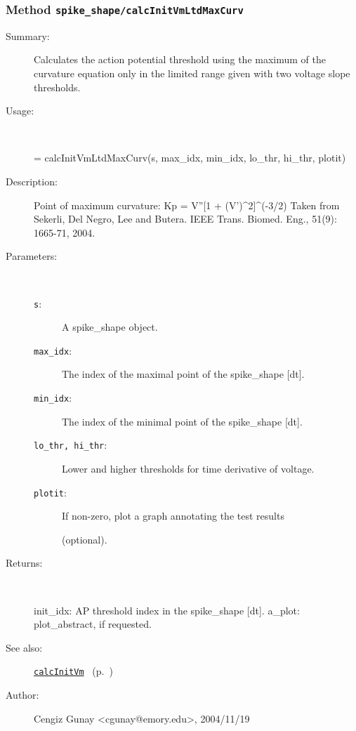 \subsubsection[Method \texttt{calcInitVmLtdMaxCurv}]{Method \texttt{spike\_shape/calcInitVmLtdMaxCurv}}%
%
\label{ref_spike_shape__calcInitVmLtdMaxCurv}%
\hypertarget{ref_spike_shape__calcInitVmLtdMaxCurv}{}%
\begin{description}
\item[Summary:]Calculates the action potential threshold using the maximum of the curvature equation only in the limited range given with two voltage slope thresholds.
%
\item[Usage:]~%
\begin{lyxcode}%
[init\_idx, a\_plot] = calcInitVmLtdMaxCurv(s, max\_idx, min\_idx, lo\_thr, hi\_thr, plotit)
%
\end{lyxcode}%
%
\item[Description:]%
Point of maximum curvature: Kp = V''[1 + (V')\textasciicircum{}2]\textasciicircum{}(-3/2)
 Taken from Sekerli, Del Negro, Lee and Butera. 
 IEEE Trans. Biomed. Eng., 51(9): 1665-71, 2004.
\item[Parameters:]~
\begin{description}%
\item[\texttt{s}:]
 A spike\_shape object.
\item[\texttt{max\_idx}:]
 The index of the maximal point of the spike\_shape [dt].
\item[\texttt{min\_idx}:]
 The index of the minimal point of the spike\_shape [dt].
\item[\texttt{lo\_thr, hi\_thr}:]
 Lower and higher thresholds for time derivative of voltage.
\item[\texttt{plotit}:]
 If non-zero, plot a graph annotating the test results 

(optional).
\end{description}%
%
\item[Returns:
]~

	init\_idx: AP threshold index in the spike\_shape [dt].
	a\_plot: plot\_abstract, if requested.
%
%
\item[See also:]%
\hyperlink{ref_calcInitVm}{\texttt{calcInitVm}}%
\ (p.~\pageref{ref_calcInitVm})%
%
%
\item[Author:]%
Cengiz Gunay <cgunay@emory.edu>, 2004/11/19
%
\end{description}
\methodline%
